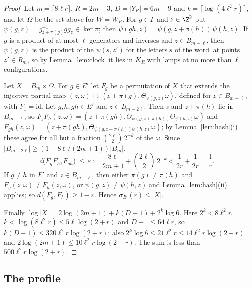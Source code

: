 \begin{proof}
Let $m=\lceil8\ell r\rceil$, $R=2m+3$, $D=|Y_R|=6m+9$ and $k=\lceil\log(4\ell^2r)\rceil$, and let $\Omega$ be the set above for $W=W_R$. For $g\in\Gamma$
and $z\in\Z^2$ put $\psi(g,z)=g_{z+\pi(g)}^{-1}gg_z\in\ker\pi$; then $\psi(gh,z)=\psi(g,z+\pi(h))\,\psi(h,z)$. If $g$ is a product of at most $\ell$
generators and inverses and $z\in B_{m-\ell}$, then $\psi(g,z)$ is the product of the $\psi(s,z')$ for the letters $s$ of the word, at points
$z'\in B_m$, so by Lemma~\ref{lem:clock} it lies in $K_R$ with lamps at no more than $\ell$ configurations.

Let $X=B_m\times\Omega$. For $g\in E'$ let $F_g$ be a permutation of $X$ that extends the injective partial map
$(z,\omega)\mapsto(z+\pi(g),\Theta_{\psi(g,z)}\omega)$, defined for $z\in B_{m-\ell}$, with $F_1=\mathrm{id}$. Let $g,h,gh\in E'$ and
$z\in B_{m-2\ell}$. Then $z$ and $z+\pi(h)$ lie in $B_{m-\ell}$, so $F_gF_h(z,\omega)=(z+\pi(gh),\Theta_{\psi(g,z+\pi(h))}\Theta_{\psi(h,z)}\omega)$ and
$F_{gh}(z,\omega)=(z+\pi(gh),\Theta_{\psi(g,z+\pi(h))\psi(h,z)}\omega)$; by Lemma~\ref{lem:hash}(i) these agree for all but a fraction
$\binom{2\ell}2\,2^{-k}$ of the $\omega$. Since $|B_{m-2\ell}|\ge(1-8\ell/(2m+1))|B_m|$,
\[
d\bigl(F_gF_h,F_{gh}\bigr)\ \le\ \varepsilon:=\frac{8\ell}{2m+1}+\binom{2\ell}2\,2^{-k}<\frac1{2r}+\frac1{2r}=\frac1r .
\]
If $g\ne h$ in $E'$ and $z\in B_{m-\ell}$, then either $\pi(g)\ne\pi(h)$ and $F_g(z,\omega)\ne F_h(z,\omega)$, or $\psi(g,z)\ne\psi(h,z)$ and
Lemma~\ref{lem:hash}(ii) applies; so $d(F_g,F_h)\ge1-\varepsilon$. Hence $\sigma_{E'}(r)\le|X|$.

Finally $\log|X|=2\log(2m+1)+k(D+1)+2^k\log6$. Here $2^k<8\ell^2r$, $k<\log(8\ell^2r)\le5\ell\log(2+r)$ and $D+1\le64\ell r$, so
$k(D+1)\le320\ell^2r\log(2+r)$; also $2^k\log6\le21\ell^2r\le14\ell^2r\log(2+r)$ and $2\log(2m+1)\le10\ell^2r\log(2+r)$. The sum is less than
$500\ell^2r\log(2+r)$.
\end{proof}

\subsection{The profile}


